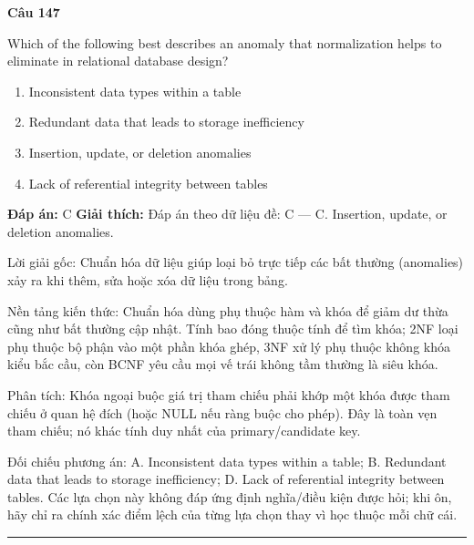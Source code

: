 \documentclass[11pt,a4paper]{article}
\newenvironment{question}[1]{%
  \par\vspace{1em}\noindent\textbf{\large Câu #1}\par\vspace{0.4em}
}{%
  \par\vspace{1em}\hrule\vspace{0.6em}
}
\newenvironment{choices}{%
  \begin{enumerate}[label=\textbf{\Alph*.},leftmargin=2.2em,itemsep=2pt,topsep=3pt]
}{%
  \end{enumerate}
}
\newcommand{\choice}{\item}
\begin{document}
\begin{question}{147}
Which of the following best describes an anomaly that normalization helps to eliminate in relational database design?
\begin{choices}
\choice Inconsistent data types within a table
\choice Redundant data that leads to storage inefficiency
\choice Insertion, update, or deletion anomalies
\choice Lack of referential integrity between tables
\end{choices}
\textbf{Đáp án:} C
\textbf{Giải thích:} Đáp án theo dữ liệu đề: C — C. Insertion, update, or deletion anomalies.

Lời giải gốc: Chuẩn hóa dữ liệu giúp loại bỏ trực tiếp các bất thường (anomalies) xảy ra khi thêm, sửa hoặc xóa dữ liệu trong bảng.

Nền tảng kiến thức: Chuẩn hóa dùng phụ thuộc hàm và khóa để giảm dư thừa cũng như bất thường cập nhật. Tính bao đóng thuộc tính để tìm khóa; 2NF loại phụ thuộc bộ phận vào một phần khóa ghép, 3NF xử lý phụ thuộc không khóa kiểu bắc cầu, còn BCNF yêu cầu mọi vế trái không tầm thường là siêu khóa.

Phân tích: Khóa ngoại buộc giá trị tham chiếu phải khớp một khóa được tham chiếu ở quan hệ đích (hoặc NULL nếu ràng buộc cho phép). Đây là toàn vẹn tham chiếu; nó khác tính duy nhất của primary/candidate key.

Đối chiếu phương án: A. Inconsistent data types within a table; B. Redundant data that leads to storage inefficiency; D. Lack of referential integrity between tables. Các lựa chọn này không đáp ứng định nghĩa/điều kiện được hỏi; khi ôn, hãy chỉ ra chính xác điểm lệch của từng lựa chọn thay vì học thuộc mỗi chữ cái.
\end{question}
\end{document}
